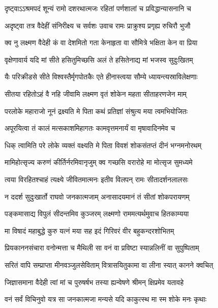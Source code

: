 
\twolineshloka
{दृष्ट्वाऽऽश्रमपदं शून्यं रामो दशरथात्मजः}
{रहितां पर्णशालां च प्रविद्धान्यासनानि च} %

\twolineshloka
{अदृष्ट्वा तत्र वैदेहीं संनिरीक्ष्य च सर्वशः}
{उवाच रामः प्राक्रुश्य प्रगृह्य रुचिरौ भुजौ} %

\twolineshloka
{क्व नु लक्ष्मण वैदेही कं वा देशमितो गता}
{केनाहृता वा सौमित्रे भक्षिता केन वा प्रिया} %

\twolineshloka
{वृक्षेणावार्य यदि मां सीते हसितुमिच्छसि}
{अलं ते हसितेनाद्य मां भजस्व सुदुःखितम्} %

\twolineshloka
{यैः परिक्रीडसे सीते विश्वस्तैर्मृगपोतकैः}
{एते हीनास्त्वया सौम्ये ध्यायन्त्यस्राविलेक्षणाः} %

\twolineshloka
{सीतया रहितोऽहं वै नहि जीवामि लक्ष्मण}
{वृतं शोकेन महता सीताहरणजेन माम्} %

\twolineshloka
{परलोके महाराजो नूनं द्रक्ष्यति मे पिता}
{कथं प्रतिज्ञां संश्रुत्य मया त्वमभियोजितः} %

\twolineshloka
{अपूरयित्वा तं कालं मत्सकाशमिहागतः}
{कामवृत्तमनार्यं वा मृषावादिनमेव च} %

\twolineshloka
{धिक् त्वामिति परे लोके व्यक्तं वक्ष्यति मे पिता}
{विवशं शोकसंतप्तं दीनं भग्नमनोरथम्} %

\twolineshloka
{मामिहोत्सृज्य करुणं कीर्तिर्नरमिवानृजुम्}
{क्व गच्छसि वरारोहे मा मोत्सृज सुमध्यमे} %

\twolineshloka
{त्वया विरहितश्चाहं त्यक्ष्ये जीवितमात्मनः}
{इतीव विलपन् रामः सीतादर्शनलालसः} %

\twolineshloka
{न ददर्श सुदुःखार्तो राघवो जनकात्मजाम्}
{अनासादयमानं तं सीतां शोकपरायणम्} %

\twolineshloka
{पङ्कमासाद्य विपुलं सीदन्तमिव कुञ्जरम्}
{लक्ष्मणो राममत्यर्थमुवाच हितकाम्यया} %

\twolineshloka
{मा विषादं महाबुद्धे कुरु यत्नं मया सह}
{इदं गिरिवरं वीर बहुकन्दरशोभितम्} %

\twolineshloka
{प्रियकाननसंचारा वनोन्मत्ता च मैथिली}
{सा वनं वा प्रविष्टा स्यान्नलिनीं वा सुपुष्पिताम्} %

\twolineshloka
{सरितं वापि सम्प्राप्ता मीनवञ्जुलसेविताम्}
{वित्रासयितुकामा वा लीना स्यात् कानने क्वचित्} %

\twolineshloka
{जिज्ञासमाना वैदेही त्वां मां च पुरुषर्षभ}
{तस्या ह्यन्वेषणे श्रीमन् क्षिप्रमेव यतावहे} %

\twolineshloka
{वनं सर्वं विचिनुवो यत्र सा जनकात्मजा}
{मन्यसे यदि काकुत्स्थ मा स्म शोके मनः कृथाः} %

